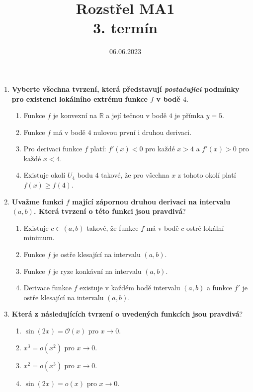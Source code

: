 \documentclass{article}
\title{Rozstřel MA1 \\
\Large 3. termín}
\date{06.06.2023}
\begin{document}
\maketitle

\begin{enumerate}
    \item \textbf{Vyberte všechna tvrzení, která představují \textit{postačující} podmínky pro existenci lokálního extrému funkce $f$ v bodě $4$}.
    \begin{enumerate}
        \item Funkce $f$ je konvexní na $\mathbb{R}$ a její tečnou v bodě $4$ je přímka $y=5$.
        \item Funkce $f$ má v bodě $4$ nulovou první i druhou derivaci.
        \item Pro derivaci funkce $f$ platí: $f'(x) < 0$ pro každé $x > 4$ a $f'(x) > 0$ pro každé $x < 4$.
        \item Existuje okolí $U_4$ bodu $4$ takové, že pro všechna $x$ z tohoto okolí platí $f(x) \geq f(4)$.
    \end{enumerate}

    \item \textbf{Uvažme funkci $f$ mající zápornou druhou derivaci na intervalu $(a,b)$. Která tvrzení o této funkci jsou pravdivá}?
    \begin{enumerate}
        \item Existuje $c \in (a,b)$ takové, že funkce $f$ má v bodě $c$ ostré lokální minimum.
        \item Funkce $f$ je ostře klesající na intervalu $(a,b)$.
        \item Funkce $f$ je ryze konkávní na intervalu $(a,b)$.
        \item Derivace funkce $f$ existuje v každém bodě intervalu $(a,b)$ a funkce $f'$ je ostře klesající na intervalu $(a,b)$.
    \end{enumerate}

    \item \textbf{Která z následujících tvrzení o uvedených funkcích jsou pravdivá}?
    \begin{enumerate}
        \item $\sin(2x) = \mathcal{O}(x)$ pro $x \to 0$.
        \item $x^3 = o(x^2)$ pro $x \to 0$.
        \item $x^2 = o(x^3)$ pro $x \to 0$.
        \item $\sin(2x) = o(x)$ pro $x \to 0$.
    \end{enumerate}


\end{enumerate}
\end{document}
